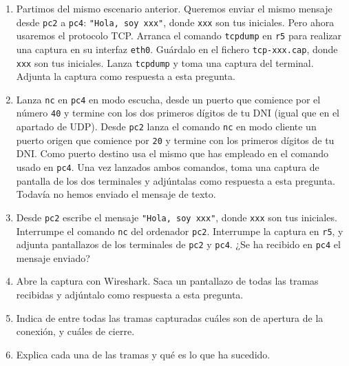 \documentclass[a4paper]{article}
\begin{document}
\begin{enumerate}[resume]
	\item Partimos del mismo escenario anterior. Queremos enviar el mismo mensaje desde \texttt{pc2} a 
	\texttt{pc4}:  \texttt{"Hola, soy xxx"}, donde \texttt{xxx} son tus iniciales. Pero ahora usaremos el 
	protocolo TCP. Arranca el comando \texttt{tcpdump} en \texttt{r5} para realizar una captura en su 
	interfaz \texttt{eth0}. Guárdalo en el fichero \texttt{tcp-xxx.cap}, donde \texttt{xxx} son tus iniciales. 
	Lanza \texttt{tcpdump} y toma una captura del terminal. Adjunta la captura como respuesta a esta 
	pregunta.
	
	\item Lanza \texttt{nc} en \texttt{pc4} en modo escucha, desde un puerto que comience por el número 
	\texttt{40} y termine con los dos primeros dígitos de tu DNI (igual que en el apartado de UDP). Desde 
	\texttt{pc2} lanza el comando \texttt{nc} en modo cliente un puerto origen que comience por \texttt{20} 
	y termine con los primeros dígitos de tu DNI. Como puerto destino usa el mismo que has empleado 
	en el comando usado en \texttt{pc4}. Una vez lanzados ambos comandos, toma una captura de pantalla 
	de los dos terminales y adjúntalas como respuesta a esta pregunta. Todavía no hemos enviado el 
	mensaje de texto.
	
	\item Desde \texttt{pc2} escribe el mensaje \texttt{"Hola, soy xxx"}, donde \texttt{xxx} son tus iniciales. 
	Interrumpe el comando \texttt{nc} del ordenador \texttt{pc2}. Interrumpe la captura en \texttt{r5}, y 
	adjunta pantallazos de los terminales de \texttt{pc2} y \texttt{pc4}. ¿Se ha recibido en \texttt{pc4} 
	el mensaje enviado?
	
	\item Abre la captura con Wireshark. Saca un pantallazo de todas las tramas recibidas y adjúntalo 
	como respuesta a esta pregunta.
	
	\item Indica de entre todas las tramas capturadas cuáles son de apertura de la conexión, y cuáles de 
	cierre.
	
	\item Explica cada una de las tramas y qué es lo que ha sucedido.
	
\end{enumerate}
\bigskip


\begin{center}
	{\LARGE{}\quad{}\quad{}}
\end{center}
\end{document}
